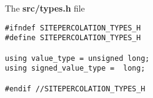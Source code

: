 

The \textbf{src/types.h} file

\begin{lstlisting}[style=CStyle]
#ifndef SITEPERCOLATION_TYPES_H
#define SITEPERCOLATION_TYPES_H

using value_type = unsigned long;
using signed_value_type =  long;

#endif //SITEPERCOLATION_TYPES_H
\end{lstlisting}